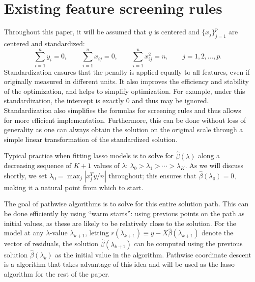 \section{Existing feature screening rules}
\label{sec:existing}

Throughout this paper, it will be assumed that $y$ is centered and $\{x_j\}_{j=1}^p$ are centered and standardized:
\begin{equation}
    \sum_{i=1}^ny_i=0, \qquad \sum_{i=1}^n x_{ij}=0, \qquad \sum_{i=1}^n x_{ij}^2=n,\qquad j=1,2,...,p.
\end{equation}
Standardization ensures that the penalty is applied equally to all features, even if originally measured in different units. It also improves the efficiency and stability of the optimization, and helps to simplify optimization.  For example, under this standardization, the intercept is exactly 0 and thus may be ignored.  Standardization also simplifies the formulas for screening rules and thus allows for more efficient implementation.  Furthermore, this can be done without loss of generality as one can always obtain the solution on the original scale through a simple linear transformation of the standardized solution.

Typical practice when fitting lasso models is to solve for $\hat{\beta}(\lambda)$ along a decreasing sequence of $K+1$ values of $\lambda$: $\lambda_0 > \lambda_1 > \cdots > \lambda_K$.  As we will discuss shortly, we set $\lambda_0=\max_j|x_j^Ty/n|$ throughout; this ensures that $\hat{\beta}(\lambda_0)=0$, making it a natural point from which to start.

The goal of pathwise algorithms is to solve for this entire solution path.  This can be done efficiently by using ``warm starts'': using previous points on the path as initial values, as these are likely to be relatively close to the solution.  For the model at any $\lambda$-value $\lambda_{k+1}$, letting $r(\lambda_{k+1}) \equiv y-X\hat{\beta}(\lambda_{k+1})$ denote the vector of residuals, the solution $\hat{\beta}(\lambda_{k+1})$ can be computed using the previous solution $\hat{\beta}(\lambda_k)$ as the initial value in the algorithm. Pathwise coordinate descent is a algorithm that takes advantage of this idea and will be used as the lasso algorithm for the rest of the paper.

